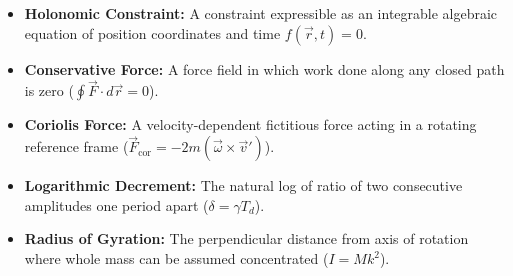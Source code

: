 \documentclass[12pt,a4paper]{article}
\begin{document}
\begin{tcolorbox}[defbox, title={\textbf{One-Line Definitions}}]
\begin{itemize}[leftmargin=*, itemsep=2pt]
  \item \textbf{Holonomic Constraint:} A constraint expressible as an integrable algebraic equation of position coordinates and time $f(\vec{r}, t) = 0$.
  \item \textbf{Conservative Force:} A force field in which work done along any closed path is zero ($\oint \vec{F} \cdot d\vec{r} = 0$).
  \item \textbf{Coriolis Force:} A velocity-dependent fictitious force acting in a rotating reference frame ($\vec{F}_{\text{cor}} = -2m(\vec{\omega} \times \vec{v}')$).
  \item \textbf{Logarithmic Decrement:} The natural log of ratio of two consecutive amplitudes one period apart ($\delta = \gamma T_d$).
  \item \textbf{Radius of Gyration:} The perpendicular distance from axis of rotation where whole mass can be assumed concentrated ($I = M k^2$).
\end{itemize}
\end{tcolorbox}
\end{document}
